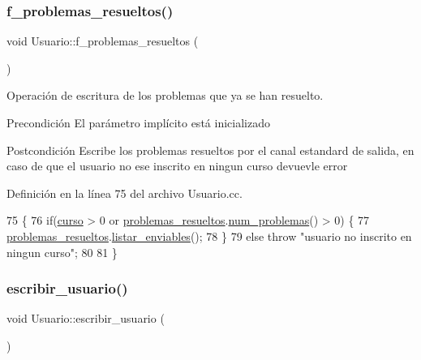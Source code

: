 \subsubsection{\texorpdfstring{f\+\_\+problemas\+\_\+resueltos()}{f\_problemas\_resueltos()}}
{\footnotesize\ttfamily void Usuario\+::f\+\_\+problemas\+\_\+resueltos (\begin{DoxyParamCaption}{ }\end{DoxyParamCaption})}



Operación de escritura de los problemas que ya se han resuelto. 

\begin{DoxyPrecond}{Precondición}
El parámetro implícito está inicializado 
\end{DoxyPrecond}
\begin{DoxyPostcond}{Postcondición}
Escribe los problemas resueltos por el canal estandard de salida, en caso de que el usuario no ese inscrito en ningun curso devuevle error 
\end{DoxyPostcond}


Definición en la línea 75 del archivo Usuario.\+cc.


\begin{DoxyCode}
75                                     \{
76   \textcolor{keywordflow}{if}(\mbox{\hyperlink{class_usuario_aa767fe2d1198f2c97791073bc55803e7}{curso}} > 0 or \mbox{\hyperlink{class_usuario_a53fa260ffc780dd5c3a4805d683e5ee7}{problemas\_resueltos}}.\mbox{\hyperlink{class_cjt__problema_acf0fca6955f991a9debb4ef50ece8905}{num\_problemas}}() > 0) \{
77     \mbox{\hyperlink{class_usuario_a53fa260ffc780dd5c3a4805d683e5ee7}{problemas\_resueltos}}.\mbox{\hyperlink{class_cjt__problema_a9f5508bb9d73918c4c99c6218315f168}{listar\_enviables}}();
78   \}
79   \textcolor{keywordflow}{else} \textcolor{keywordflow}{throw} \textcolor{stringliteral}{"usuario no inscrito en ningun curso"};
80 
81 \}
\end{DoxyCode}
\mbox{\label{class_usuario_a501a484852ba4eca86c0e78f246c87e9}} 
\subsubsection{\texorpdfstring{escribir\+\_\+usuario()}{escribir\_usuario()}}
{\footnotesize\ttfamily void Usuario\+::escribir\+\_\+usuario (\begin{DoxyParamCaption}{ }\end{DoxyParamCaption})}



